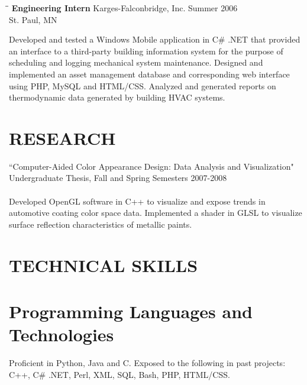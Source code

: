 \documentclass{res}
\begin{document}
\begin{resume}
   \begin{tabbing}%
   \hspace{2.3in}\= \hspace{2.6in}\= \kill %
   {\bf Engineering Intern}  \>Karges-Falconbridge, Inc. \> Summer 2006\\
                          \>St. Paul, MN
   \end{tabbing}\vspace{-18pt}
   		Developed and tested a Windows Mobile application in C\# .NET that provided an interface to a third-party building information 				system for the purpose of scheduling and logging mechanical system maintenance. Designed and 						implemented an asset management database and corresponding web interface using PHP, MySQL and HTML/CSS. Analyzed and generated 				reports on thermodynamic data generated by building HVAC systems.   

\section{RESEARCH}
\vspace{0.1in}
	``Computer-Aided Color Appearance Design: Data Analysis and Visualization" \\
	Undergraduate Thesis, Fall and Spring Semesters 2007-2008 \\
\\
		Developed OpenGL software in C++ to visualize and expose trends in automotive coating color space data. Implemented a shader in GLSL to visualize surface reflection characteristics of metallic paints.

\section{TECHNICAL SKILLS}          
\vspace{0.05in}	
\normalsize{\section{Programming Languages and Technologies}}
\vspace{0.05in} 
		Proficient in Python, Java and C. Exposed to the following in past projects: C++, C\# .NET, Perl, XML, SQL, Bash, PHP, HTML/CSS.


\end{resume}
\end{document}
